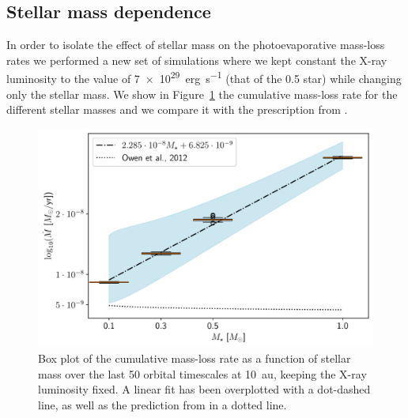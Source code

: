 \documentclass[usenatbib,useAMS,usedcolumn]{mnras}
\begin{document}
\subsection{Stellar mass dependence}\label{sec:mass-dependance}
In order to isolate the effect of stellar mass on the photoevaporative mass-loss rates we performed a new set of simulations where we kept constant the X-ray luminosity to the value of \SI{7e29}{erg.s^{-1}} (that of the \SI{0.5}{\solarmass} star) while changing only the stellar mass.
We show in Figure~\ref{fig:cumdotMtest} the cumulative mass-loss rate for the different stellar masses and we compare it with the prescription from .
\begin{figure}
  \centering
  \includegraphics[width=\columnwidth]{Figure8}
  \caption{Box plot of the cumulative mass-loss rate as a function of stellar mass over the last 50 orbital timescales at \SI{10}{\astronomicalunit}, keeping the X-ray luminosity fixed. A linear fit has been overplotted with a dot-dashed line, as well as the prediction from  in a dotted line.\label{fig:cumdotMtest}}
\end{figure}
\end{document}
